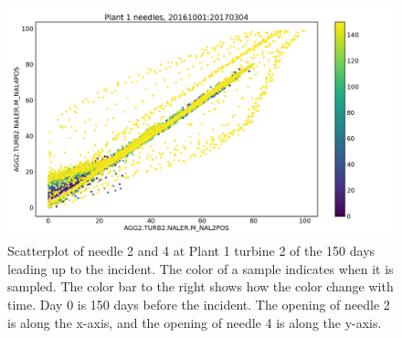         \begin{figure}
            \centering
            \includegraphics[width=\textwidth]{report/figures/analysis/plant1_error/needle_2_4_20161001-20170304_dots.png}
            \caption{Scatterplot of needle 2 and 4 at Plant 1 turbine 2 of the 150 days leading up to the incident. The color of a sample indicates when it is sampled. The color bar to the right shows how the color change with time. Day 0 is 150 days before the incident. The opening of needle 2 is along the x-axis, and the opening of needle 4 is along the y-axis.}
            \label{fig:plan1_scatter_20161001-20170304}
        \end{figure}
